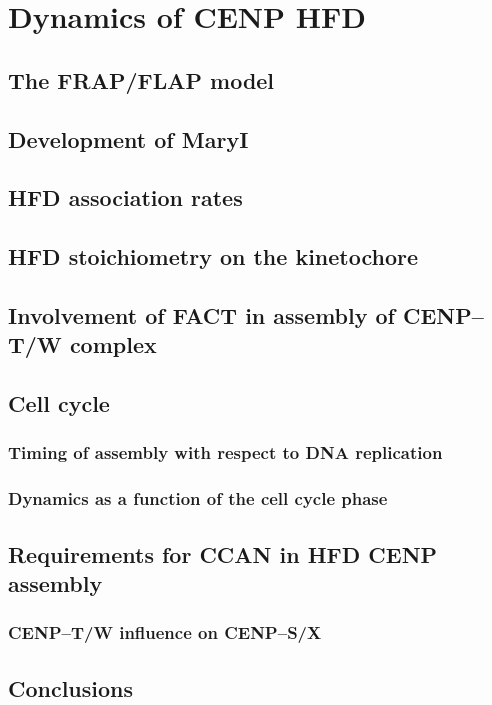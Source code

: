 \chapter{Dynamics of CENP HFD}
\label{ch:cenp}


\section{The FRAP/FLAP model}
\section{Development of MaryI}
\section{HFD association rates}
\section{HFD stoichiometry on the kinetochore}
\section{Involvement of FACT in assembly of CENP–T/W complex}
\section{Cell cycle}
  \subsection{Timing of assembly with respect to DNA replication}
  \subsection{Dynamics as a function of the cell cycle phase}
\section{Requirements for CCAN in HFD CENP assembly}
  \subsection{CENP–T/W influence on CENP–S/X}
\section{Conclusions}
